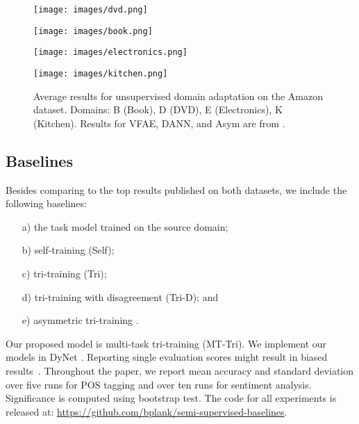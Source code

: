 \documentclass[11pt,a4paper]{article}
\begin{document}
\begin{figure*}[!hbt]
\begin{minipage}{.48\linewidth}
      \centering
         \texttt{[image: images/dvd.png]}
    \end{minipage}\hspace*{0.1cm}
    \begin{minipage}{.48\linewidth}
      \centering
         \texttt{[image: images/book.png]}
    \end{minipage}
\begin{minipage}{.48\linewidth}
      \centering
        \texttt{[image: images/electronics.png]}
    \end{minipage}\hspace*{0.2cm}
    \begin{minipage}{.48\linewidth}
      \centering
        \texttt{[image: images/kitchen.png]}
    \end{minipage}
    \caption{Average results for unsupervised domain adaptation on the Amazon dataset. Domains: B (Book), D (DVD), E (Electronics), K (Kitchen). Results for VFAE, DANN, and Asym are from .}
\label{fig:sentiment_results}
\end{figure*}

\subsection{Baselines} 
Besides comparing to the top results published on both datasets, we include the following baselines:
\begin{itemize}
\itemsep-3pt
\item[a)] the task model trained on the source domain; 
\item[b)] self-training (Self); 
\item[c)] tri-training (Tri); 
\item[d)] tri-training with disagreement (Tri-D); and 
\item[e)] asymmetric tri-training \cite{Saito2017}. 
\end{itemize}
Our proposed model is multi-task tri-training (MT-Tri). We implement our models in DyNet \cite{neubig2017dynet}. Reporting single evaluation scores might result in biased results~\cite{reimers-gurevych:2017:EMNLP2017}. Throughout the paper, we report mean accuracy and standard deviation over five runs for POS tagging and over ten runs for sentiment analysis. Significance is computed using bootstrap test. The code for all experiments is released at: \url{https://github.com/bplank/semi-supervised-baselines}.
\end{document}
